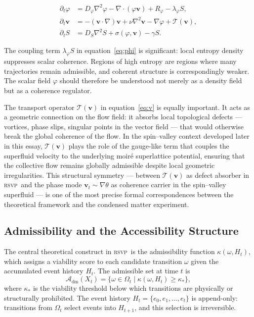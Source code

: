 \documentclass[11pt,a4paper]{article}
\theoremstyle{plain}
\theoremstyle{definition}
\theoremstyle{remark}
\newcommand{\Adm}{\mathcal{A}_{\mathrm{dm}}}
\newcommand{\RSVP}{\textup{\textsc{rsvp}}}
\newcommand{\Omg}{\Omega}
\begin{document}
\begin{align}
\partial_t \varphi &= D_\varphi \nabla^2 \varphi
  - \nabla \cdot (\varphi \mathbf{v})
  + R_\varphi - \lambda_\varphi S, \label{eq:phi}\\
\partial_t \mathbf{v} &= -(\mathbf{v} \cdot \nabla)\mathbf{v}
  + \nu \nabla^2 \mathbf{v}
  - \nabla \varphi
  + \mathcal{T}(\mathbf{v}), \label{eq:v}\\
\partial_t S &= D_S \nabla^2 S
  + \sigma(\varphi, \mathbf{v})
  - \gamma S. \label{eq:S}
\end{align}

The coupling term $\lambda_\varphi S$ in equation~\eqref{eq:phi} is
significant: local entropy density suppresses scalar coherence. Regions
of high entropy are regions where many trajectories remain admissible,
and coherent structure is correspondingly weaker. The scalar field $\varphi$
should therefore be understood not merely as a density field but as a
coherence regulator.

The transport operator $\mathcal{T}(\mathbf{v})$ in equation~\eqref{eq:v}
is equally important. It acts as a geometric connection on the flow field:
it absorbs local topological defects --- vortices, phase slips, singular
points in the vector field --- that would otherwise break the global
coherence of the flow. In the spin--valley context developed later in this
essay, $\mathcal{T}(\mathbf{v})$ plays the role of the gauge-like term
that couples the superfluid velocity to the underlying moiré superlattice
potential, ensuring that the collective flow remains globally admissible
despite local geometric irregularities. This structural symmetry --- between
$\mathcal{T}(\mathbf{v})$ as defect absorber in \RSVP\ and the phase mode
$\mathbf{v}_t \sim \nabla\theta$ as coherence carrier in the spin--valley
superfluid --- is one of the most precise formal correspondences between the
theoretical framework and the condensed matter experiment.

\subsection{Admissibility and the Accessibility Structure}

The central theoretical construct in \RSVP\ is the admissibility function
$\kappa(\omega, H_t)$, which assigns a viability score to each candidate
transition $\omega$ given the accumulated event history $H_t$. The
admissible set at time $t$ is
\[
\Adm(X_t) = \bigl\{\omega \in \Omg_t \mid \kappa(\omega, H_t) \geq \kappa_*\bigr\},
\]
where $\kappa_*$ is the viability threshold below which transitions are
physically or structurally prohibited. The event history $H_t =
\{e_0, e_1, \ldots, e_t\}$ is append-only: transitions from $\Omg_t$
select events into $H_{t+1}$, and this selection is irreversible.
\end{document}

